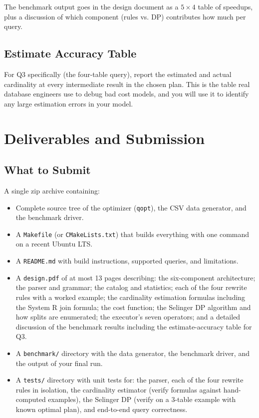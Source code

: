 \documentclass[11pt,a4paper]{article}
\begin{document}
The benchmark output goes in the design document as a $5 \times 4$ table of speedups, plus a discussion of which component (rules vs. DP) contributes how much per query.

\subsection{Estimate Accuracy Table}
For Q3 specifically (the four-table query), report the estimated and actual cardinality at every intermediate result in the chosen plan. This is the table real database engineers use to debug bad cost models, and you will use it to identify any large estimation errors in your model.

\section{Deliverables and Submission}

\subsection{What to Submit}
A single zip archive containing:

\begin{itemize}
\item Complete source tree of the optimizer (\texttt{qopt}), the CSV data generator, and the benchmark driver.
\item A \texttt{Makefile} (or \texttt{CMakeLists.txt}) that builds everything with one command on a recent Ubuntu LTS.
\item A \texttt{README.md} with build instructions, supported queries, and limitations.
\item A \texttt{design.pdf} of at most 13 pages describing: the six-component architecture; the parser and grammar; the catalog and statistics; each of the four rewrite rules with a worked example; the cardinality estimation formulas including the System R join formula; the cost function; the Selinger DP algorithm and how splits are enumerated; the executor's seven operators; and a detailed discussion of the benchmark results including the estimate-accuracy table for Q3.
\item A \texttt{benchmark/} directory with the data generator, the benchmark driver, and the output of your final run.
\item A \texttt{tests/} directory with unit tests for: the parser, each of the four rewrite rules in isolation, the cardinality estimator (verify formulas against hand-computed examples), the Selinger DP (verify on a 3-table example with known optimal plan), and end-to-end query correctness.
\end{itemize}
\end{document}
